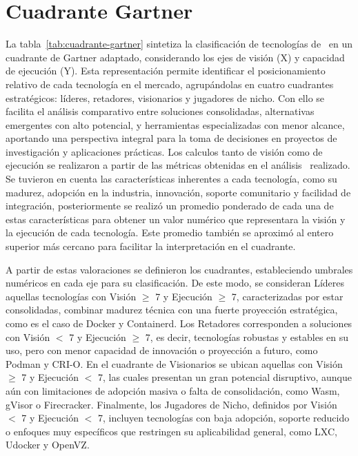 \section{Cuadrante Gartner}
\noindent
La tabla~\ref{tab:cuadrante-gartner} sintetiza la clasificación de tecnologías de \VBC\ en un cuadrante de Gartner adaptado, considerando los ejes de visión (X) y capacidad de ejecución (Y). Esta representación permite identificar el posicionamiento relativo de cada tecnología en el mercado, agrupándolas en cuatro cuadrantes estratégicos: líderes, retadores, visionarios y jugadores de nicho. Con ello se facilita el análisis comparativo entre soluciones consolidadas, alternativas emergentes con alto potencial, y herramientas especializadas con menor alcance, aportando una perspectiva integral para la toma de decisiones en proyectos de investigación y aplicaciones prácticas.
Los calculos tanto de visión como de ejecución se realizaron a partir de las métricas obtenidas en el análisis \DAR\ realizado. Se tuvieron en cuenta las características inherentes a cada tecnología, como su madurez, adopción en la industria, innovación, soporte comunitario y facilidad de integración, posteriormente se realizó un promedio ponderado de cada una de estas características para obtener un valor numérico que representara la visión y la ejecución de cada tecnología. Este promedio también se aproximó al entero superior más cercano para facilitar la interpretación en el cuadrante.

\noindent
A partir de estas valoraciones se definieron los cuadrantes, estableciendo umbrales numéricos en cada eje para su clasificación. De este modo, se consideran Líderes aquellas tecnologías con Visión $\geq$ 7 y Ejecución $\geq$ 7, caracterizadas por estar consolidadas, combinar madurez técnica con una fuerte proyección estratégica, como es el caso de Docker y Containerd. Los Retadores corresponden a soluciones con Visión $<$ 7 y Ejecución $\geq$ 7, es decir, tecnologías robustas y estables en su uso, pero con menor capacidad de innovación o proyección a futuro, como Podman y CRI-O. En el cuadrante de Visionarios se ubican aquellas con Visión $\geq$ 7 y Ejecución $<$ 7, las cuales presentan un gran potencial disruptivo, aunque aún con limitaciones de adopción masiva o falta de consolidación, como Wasm, gVisor o Firecracker. Finalmente, los Jugadores de Nicho, definidos por Visión $<$ 7 y Ejecución $<$ 7, incluyen tecnologías con baja adopción, soporte reducido o enfoques muy específicos que restringen su aplicabilidad general, como LXC, Udocker y OpenVZ.


